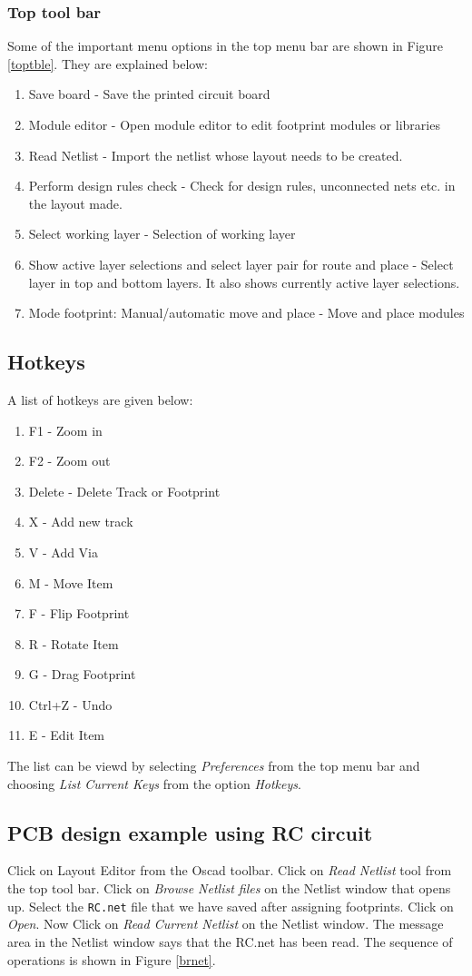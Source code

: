 \subsubsection{Top tool bar}
Some of the important menu options in the top menu bar are shown in Figure \ref{toptble}. They are explained below:
\begin{enumerate}
\item Save board - Save the printed circuit board
\item Module editor - Open module editor to edit footprint modules or libraries
\item Read Netlist - Import the netlist whose layout needs to be created.
\item Perform design rules check - Check for design rules, unconnected nets etc. in the layout made.
\item Select working layer - Selection of working layer
\item Show active layer selections and select layer pair for route and place - Select layer in top and bottom layers. It also shows currently active layer selections.
\item Mode footprint: Manual/automatic move and place - Move and place modules
\end{enumerate}
\subsection{Hotkeys}
A list of hotkeys are given below:
\begin{enumerate}
\item F1 - Zoom in
\item F2 - Zoom out
\item Delete - Delete Track or Footprint
\item  X - Add new track
\item V - Add Via
\item M - Move Item
\item F - Flip Footprint
\item R - Rotate Item
\item G - Drag Footprint
\item Ctrl+Z - Undo
\item E - Edit Item
\end{enumerate}
The list can be viewd by selecting \textit{Preferences} from the top menu bar and choosing \textit{List Current Keys} from the option \textit{Hotkeys}.
\subsection{PCB design example using RC circuit}
Click on Layout Editor from the Oscad toolbar. Click on \textit{Read Netlist} tool from the top tool bar. Click on \textit{Browse Netlist files} on the Netlist window that opens up. Select the {\tt RC.net} file that we have saved after assigning footprints. Click on \textit{Open}. Now Click on \textit{Read Current Netlist} on the Netlist window. The message area in the Netlist window says that the RC.net has been read. The sequence of operations is shown in Figure \ref{brnet}.

